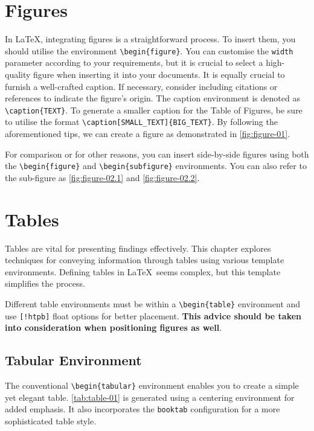 \section{Figures}
In \LaTeX, integrating figures is a straightforward process. To insert them, you should utilise the environment \verb|\begin{figure}|. You can customise the \verb|width| parameter according to your requirements, but it is crucial to select a high-quality figure when inserting it into your documents. It is equally crucial to furnish a well-crafted caption. If necessary, consider including citations or references to indicate the figure's origin. The caption environment is denoted as \verb|\caption{TEXT}|. To generate a smaller caption for the Table of Figures, be sure to utilise the format \verb|\caption[SMALL_TEXT]{BIG_TEXT}|. By following the aforementioned tips, we can create a figure as demonstrated in \autoref{fig:figure-01}.

For comparison or for other reasons, you can insert side-by-side figures using both the \verb|\begin{figure}| and \verb|\begin{subfigure}| environments. You can also refer to the sub-figure as \autoref{fig:figure-02.1} and \autoref{fig:figure-02.2}.

\section{Tables}
Tables are vital for presenting findings effectively. This chapter explores techniques for conveying information through tables using various template environments. Defining tables in \LaTeX\ seems complex, but this template simplifies the process.

\begin{block}[tip]
Different table environments must be within a \texttt{\textbackslash begin\{table\}} environment and use \texttt{[!htpb]} float options for better placement. \textbf{This advice should be taken into consideration when positioning figures as well}.
\end{block}

\subsection{Tabular Environment}
The conventional \verb|\begin{tabular}| environment enables you to create a simple yet elegant table. \autoref{tab:table-01} is generated using a centering environment for added emphasis. It also incorporates the \verb|booktab| configuration for a more sophisticated table style.

